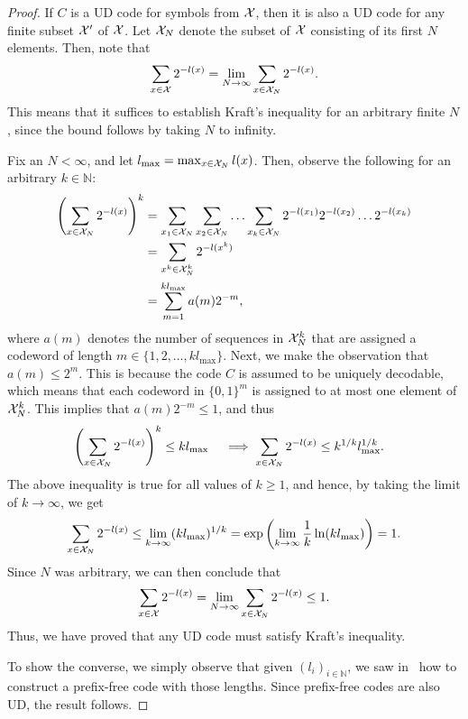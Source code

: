     \begin{proof}
        If $C$ is a UD code for symbols from $\mathcal{X}$, then it is also a UD code for any finite subset $\mathcal{X}'$ of $\mathcal{X}$. Let $\mathcal{X}_N$ denote the subset of $\mathcal{X}$ consisting of its first $N$ elements. Then, note that 
        \begin{align}
            \sum_{x \in \mathcal{X}} 2^{-l(x)} = \lim_{N \to \infty} \sum_{x \in \mathcal{X}_N} 2^{-l(x)}. 
        \end{align}
        This means that it suffices to establish Kraft's inequality for an arbitrary finite $N$, since the bound follows by taking $N$ to infinity. 

        Fix an $N< \infty$, and let $l_{\max} = \max_{x \in \mathcal{X}_N} l(x)$. Then, observe the following for an arbitrary $k \in \mathbb{N}$: 
        \begin{align}
            \left( \sum_{x \in \mathcal{X}_N} 2^{-l(x)} \right) ^k &= \sum_{x_1 \in \mathcal{X}_N} \sum_{x_2 \in \mathcal{X}_N}\ldots \sum_{x_k \in \mathcal{X}_N} 2^{- l(x_1)}2^{- l(x_2)} \ldots 2^{- l(x_k)} \\ 
            & = \sum_{x^k \in \mathcal{X}_N^k} 2^{-l(x^k)} \\
            & = \sum_{m=1}^{k l_{\max}} a(m) 2^{-m}, 
        \end{align}
        where $a(m)$ denotes the number of sequences in $\mathcal{X}_N^k$ that are assigned a codeword of length $m \in \{1, 2, \ldots, k l_{\max} \}$.  Next, we make the observation that $a(m) \leq 2^m$. This is because the code $C$ is assumed to be uniquely decodable, which means that each codeword in $\{0, 1\}^m$ is assigned to at most one element of $\mathcal{X}_N^k$. This implies that $a(m)  2^{-m} \leq 1$, and thus 
        \begin{align}
            &\left( \sum_{x \in \mathcal{X}_N} 2^{-l(x)} \right)^{k} \leq k l_{\max}\quad  
            \implies  \sum_{x \in \mathcal{X}_N} 2^{-l(x)} \leq k^{1/k} l_{\max}^{1/k}. 
        \end{align}
        The above inequality is true for all values of $k \geq 1$, and hence, by taking the limit of $k \to \infty$, we get 
        \begin{align}
            \sum_{x \in \mathcal{X}_N} 2^{-l(x)} \leq \lim_{k \to \infty} (k l_{\max})^{1/k} = \exp \left(  \lim_{k \to \infty} \frac{1}{k}\ln (k l_{\max}) \right) = 1. 
        \end{align}
        Since $N$ was arbitrary, we can then conclude that 
        \begin{align}
            \sum_{x \in \mathcal{X}}2^{-l(x)} = \lim_{N \to \infty} \sum_{x \in \mathcal{X}_N} 2^{-l(x)} \leq 1. 
        \end{align}
        Thus, we have proved that any UD code must satisfy Kraft's inequality. 
        
        To show the converse, we simply observe that given $(l_i)_{i \in \mathbb{N}}$, we saw in~ how to construct a prefix-free code with those lengths. Since prefix-free codes are also UD, the result follows. 
    \end{proof}

